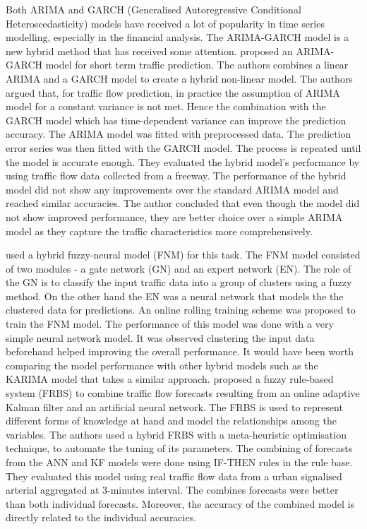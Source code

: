 Both ARIMA and GARCH (Generalised Autoregressive Conditional Heteroscedasticity) models have received
a lot of popularity in time series modelling, especially in the financial analysis. The ARIMA-GARCH
model is a new hybrid method that has received some attention. \citet{chen2011short} proposed an
ARIMA-GARCH model for short term traffic prediction. The authors combines a linear ARIMA and a GARCH
model to create a hybrid non-linear model. The authors argued that, for traffic flow prediction, in
practice the assumption of ARIMA model for a constant variance is not met. Hence the combination with
the GARCH model which has time-dependent variance can improve the prediction accuracy. The ARIMA model
was fitted with preprocessed data. The prediction error series was then fitted with the GARCH model.
The process is repeated until the model is accurate enough. They evaluated the hybrid model's
performance by using traffic flow data collected from a freeway. The performance of the hybrid model
did not show any improvements over the standard ARIMA model and reached similar accuracies. The author
concluded that even though the model did not show improved performance, they are better choice over
a simple ARIMA model as they capture the traffic characteristics more comprehensively.

\citet{yin2002urban} used a hybrid fuzzy-neural model (FNM) for this task. The FNM model consisted of
two modules - a gate network (GN) and an expert network (EN). The role of the GN is to classify the
input traffic data into a group of clusters using a fuzzy method. On the other hand the EN was a
neural network that models the the clustered data for predictions. An online rolling training scheme
was proposed to train the FNM model. The performance of this model was done with a very simple neural
network model. It was observed clustering the input data beforehand helped improving the overall
performance. It would have been worth comparing the model performance with other hybrid models such
as the KARIMA model that takes a similar approach.\citet{stathopoulos2008fuzzy} proposed a fuzzy
rule-based system (FRBS) to combine traffic flow forecasts resulting from an online adaptive Kalman
filter and an artificial neural network. The FRBS is used to represent different forms of knowledge
at hand and model the relationships among the variables. The authors used a hybrid FRBS with a
meta-heuristic optimisation technique, to automate the tuning of its parameters. The combining of
forecasts from the ANN and KF models were done using IF-THEN rules in the rule base. They evaluated
this model using real traffic flow data from a urban signalised arterial aggregated at 3-minutes
interval. The combines forecasts were better than both individual forecasts. Moreover, the accuracy
of the combined model is directly related to the individual accuracies.

